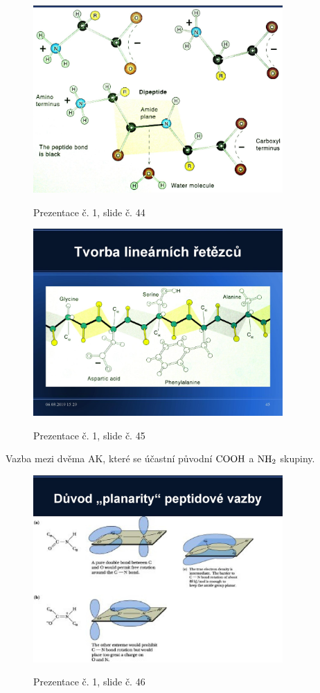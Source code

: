 \documentclass[DIV=8]{scrreprt}
\begin{document}
\begin{figure}
    \caption{Prezentace č. 1, slide č. 44}
    \includegraphics[width=0.85\textwidth]{slides-1/slide-44.jpg}
    \centering
    \label{slides-1-slide-44}
\end{figure}
\begin{figure}
    \caption{Prezentace č. 1, slide č. 45}
    \includegraphics[width=0.85\textwidth]{slides-1/slide-45.jpg}
    \centering
    \label{slides-1-slide-45}
\end{figure}

Vazba mezi dvěma AK, které se účastní původní \(\ce{COOH}\) a \(\ce{NH2}\) skupiny.

\begin{figure}
    \caption{Prezentace č. 1, slide č. 46}
    \includegraphics[width=0.85\textwidth]{slides-1/slide-46.jpg}
    \centering
    \label{slides-1-slide-46}
\end{figure}
\end{document}
